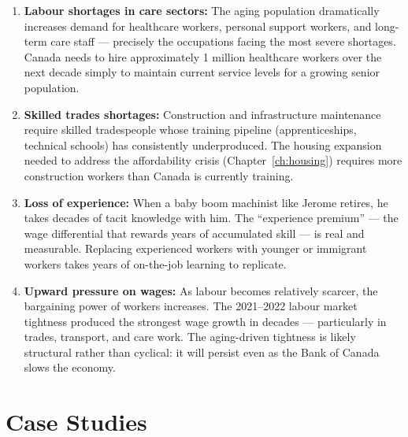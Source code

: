 \begin{enumerate}
  \item \textbf{Labour shortages in care sectors:} The aging population
        dramatically increases demand for healthcare workers, personal support
        workers, and long-term care staff --- precisely the occupations facing
        the most severe shortages. Canada needs to hire approximately 1 million
        healthcare workers over the next decade simply to maintain current
        service levels for a growing senior population.

  \item \textbf{Skilled trades shortages:} Construction and infrastructure
        maintenance require skilled tradespeople whose training pipeline
        (apprenticeships, technical schools) has consistently underproduced.
        The housing expansion needed to address the affordability crisis
        (Chapter~\ref{ch:housing}) requires more construction workers than
        Canada is currently training.

  \item \textbf{Loss of experience:} When a baby boom machinist like Jerome
        retires, he takes decades of tacit knowledge with him. The
        ``experience premium'' --- the wage differential that rewards years of
        accumulated skill --- is real and measurable. Replacing experienced
        workers with younger or immigrant workers takes years of on-the-job
        learning to replicate.

  \item \textbf{Upward pressure on wages:} As labour becomes relatively
        scarcer, the bargaining power of workers increases. The 2021--2022
        labour market tightness produced the strongest wage growth in
        decades --- particularly in trades, transport, and care work.
        The aging-driven tightness is likely structural rather than cyclical:
        it will persist even as the Bank of Canada slows the economy.
\end{enumerate}

\section{Case Studies}
\label{sec:ch4_casestudies}

